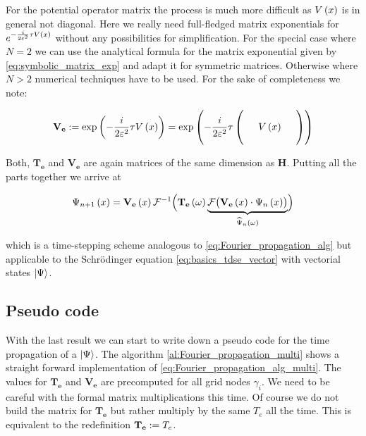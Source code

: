 For the potential operator matrix the process is much more difficult as $V\left( x \right)$
is in general not diagonal. Here we really need full-fledged matrix exponentials for
$e^{-\frac{i}{2\varepsilon^2} \tau V\left( x \right)}$ without any possibilities for simplification.
For the special case where $N = 2$ we can use the analytical formula for the
matrix exponential given by \eqref{eq:symbolic_matrix_exp} and adapt it for symmetric
matrices. Otherwise where $N > 2$ numerical techniques have to be used. For the
sake of completeness we note:

\begin{equation} \label{eq:def_Fourier_operator_exponentials_multi_V}
  \mathbf{V_e} :=
  \exp \left(  -\frac{i}{2\varepsilon^2} \tau V\left( x \right)  \right)
  =
  \exp \left(  -\frac{i}{2\varepsilon^2} \tau
  \left(
  \begin{array}{ccc}
    {} & {} & {} \\
    {} & V\left( x \right)  & {} \\
    {} & {} & {}
  \end{array} \right)
   \right)
\end{equation}

Both, $\mathbf{T_e}$ and $\mathbf{V_e}$ are again matrices of the same dimension
as $\mathbf{H}$. Putting all the parts together we arrive at

\begin{equation} \label{eq:Fourier_propagation_alg_multi}
  \Psi_{n+1}\left( x \right) =
  \mathbf{V_e}\left( x \right) \mathcal{F}^{-1} \Bigl(
    \mathbf{T_e}\left( \omega \right) \underbrace{ \mathcal{F}\bigl(
      \mathbf{V_e}\left( x \right) \cdot \Psi_n\left( x \right)
    \bigr)}_{\widehat{\Psi}_n\left( \omega \right)}
  \Bigr)
\end{equation}

which is a time-stepping scheme analogous to \eqref{eq:Fourier_propagation_alg}
but applicable to the Schrödinger equation \eqref{eq:basics_tdse_vector} with
vectorial states $\Ket{\Psi}$.


\subsection{Pseudo code}

With the last result we can start to write down a pseudo code for the time
propagation of a $\Ket{\Psi}$. The algorithm \ref{al:Fourier_propagation_multi}
shows a straight forward implementation of \eqref{eq:Fourier_propagation_alg_multi}.
The values for $\mathbf{T_e}$ and $\mathbf{V_e}$ are precomputed for all
grid nodes $\gamma_i$. We need to be careful with the formal matrix multiplications
this time. Of course we do not build the matrix for $\mathbf{T_e}$ but rather
multiply by the same $T_e$ all the time. This is equivalent to the redefinition
$\mathbf{T_e} := T_e$.

